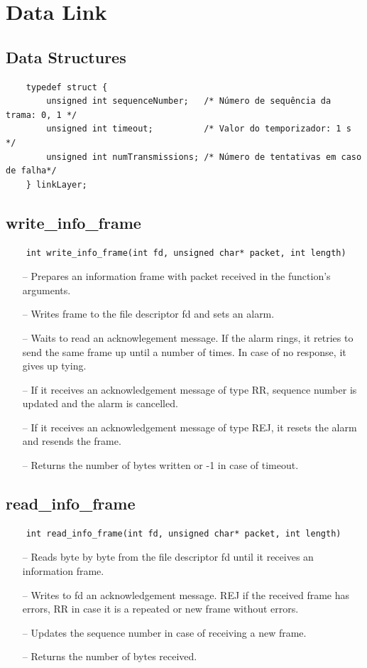 \documentclass[11pt]{report}
\begin{document}
\section{Data Link} 

\subsection{Data Structures}
\begin{verbatim}
    typedef struct {
        unsigned int sequenceNumber;   /* Número de sequência da trama: 0, 1 */
        unsigned int timeout;          /* Valor do temporizador: 1 s */
        unsigned int numTransmissions; /* Número de tentativas em caso de falha*/
    } linkLayer;
\end{verbatim}

\subsection{write\_info\_frame}
\begin{verbatim}
    int write_info_frame(int fd, unsigned char* packet, int length)
\end{verbatim}
\begin{itemize} 
    \item[--] Prepares an information frame with packet received in the function's arguments.
    \item[--] Writes frame to the file descriptor fd and sets an alarm.
    \item[--] Waits to read an acknowlegement message. If the alarm rings, it retries to send the same frame up until a number of times. In case of no response, it gives up tying.
    \item[--] If it receives an acknowledgement message of type RR, sequence number is updated and the alarm is cancelled.
    \item[--] If it receives an acknowledgement message of type REJ, it resets the alarm and resends the frame.
    \item[--] Returns the number of bytes written or -1 in case of timeout.
\end{itemize}

\subsection{read\_info\_frame}
\begin{verbatim}
    int read_info_frame(int fd, unsigned char* packet, int length)
\end{verbatim}
\begin{itemize}
    \item[--] Reads byte by byte from the file descriptor fd until it receives an information frame. 
    \item[--] Writes to fd an acknowledgement message. REJ if the received frame has errors, RR in case it is a repeated or new frame without errors. 
    \item[--] Updates the sequence number in case of receiving a new frame. 
    \item[--] Returns the number of bytes received.
\end{itemize}
\end{document}
